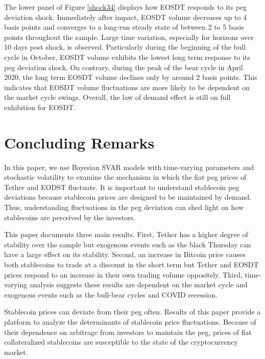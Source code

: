 \documentclass[12pt]{article}
\begin{document}
The lower panel of Figure \ref{shock34} displays how EOSDT responds to its peg deviation shock. Immediately after impact, EOSDT volume decreases up to 4 basis points and converges to a long-run steady state of between 2 to 5 basis points throughout the sample. Large time variation, especially for horizons over 10 days post shock, is observed. Particularly during the beginning of the bull cycle in October, EOSDT volume exhibits the lowest long term response to its peg deviation shock. On contrary, during the peak of the bear cycle in April 2020, the long term EOSDT volume declines only by around 2 basis points. This indicates that EOSDT volume fluctuations are more likely to be dependent on the market cycle swings. Overall, the law of demand effect is still on full exhibition for EOSDT.


\section{Concluding Remarks}
In this paper, we use Bayesian SVAR models with time-varying parameters and stochastic volatility to examine the mechanism in which the fiat peg prices of Tether and EODST fluctuate. It is important to understand stablecoin peg deviations because stablecoin prices are designed to be maintained by demand. Thus, understanding fluctuations in the peg deviation can shed light on how stablecoins are perceived by the investors.

This paper documents three main results. First, Tether has a higher degree of stability over the sample but exogenous events such as the black Thursday can have a large effect on its stability. Second, an increase in Bitcoin price causes both stablecoins to trade at a discount in the short term but Tether and EOSDT prices respond to an increase in their own trading volume oppositely. Third, time-varying analysis suggests these results are dependent on the market cycle and exogenous events such as the bull-bear cycles and COVID recession.

Stablecoin prices can deviate from their peg often. Results of this paper provide a platform to analyze the determinants of stablecoin price fluctuations. Because of their dependence on arbitrage from investors to maintain the peg, prices of fiat collateralized stablecoins are susceptible to the state of the cryptocurrency market. 




\clearpage
\end{document}
